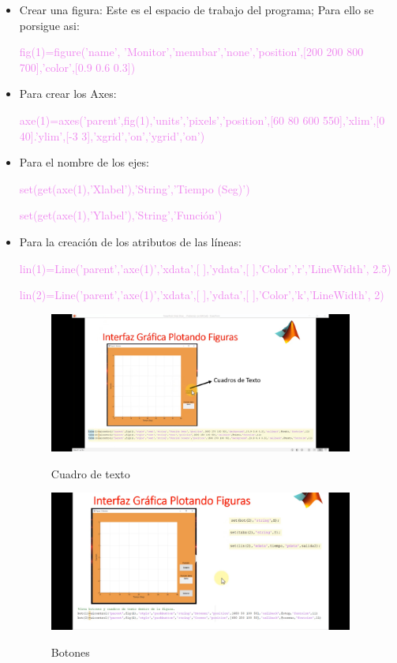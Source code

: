 \documentclass{article}
\begin{document}
	\begin{itemize}
		\item Crear una figura: Este es el espacio de trabajo del programa; Para ello se porsigue asi: 
		
		\textcolor{violet}{fig(1)=figure('name', 'Monitor','menubar','none','position',[200 200 800 700],'color',[0.9 0.6 0.3])}
		
	\item Para crear los Axes:
		
		\textcolor{violet}{axe(1)=axes('parent',fig(1),'units','pixels','position',[60 80 600 550],'xlim',[0 40].'ylim',[-3 3],'xgrid','on','ygrid','on')}
		
	\item Para el nombre de los ejes:
	
	\textcolor{violet}{set(get(axe(1),'Xlabel'),'String','Tiempo (Seg)')}
	
	\textcolor{violet}{set(get(axe(1),'Ylabel'),'String','Función')}
	
	\item Para la creación de los atributos de las líneas:
	
	\textcolor{violet}{lin(1)=Line('parent','axe(1)','xdata',[ ],'ydata',[ ],'Color','r','LineWidth', 2.5)}
	
	\textcolor{violet}{lin(2)=Line('parent','axe(1)','xdata',[ ],'ydata',[ ],'Color','k','LineWidth', 2)}
	
	
	\begin{figure}[h!]
		\centering
		\includegraphics[width = 100mm]{imagenes/Funciones/1}
		\label{txt}
		\caption{Cuadro de texto}
	\end{figure}


	\begin{figure}[h!]
		\centering
		\includegraphics[width = 100mm]{imagenes/Funciones/6}
		\label{botones}
		\caption{Botones}
	\end{figure}



\end{itemize}
\end{document}
